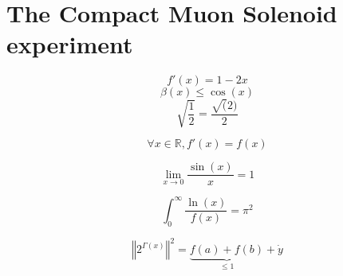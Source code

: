 \section{The Compact Muon Solenoid experiment}
\label{sec:CMS}



\[ f'(x) = 1-2x \]
\[ \beta(x) \leq \cos(x) \]
\[ \sqrt{\frac{1}{2}}=\frac{\sqrt(2)}{2} \]

\begin{equation}
\forall x \in \mathbb{R}, f'(x)=f(x)
\end{equation}

\begin{equation}
\lim_{x\to 0}\frac{\sin(x)}{x}=1
\end{equation}

\begin{equation}
\int_{0}^{\infty}\frac{\ln(x)}{f(x)}=\pi^2
\end{equation}

\begin{equation*}
\left\Vert 2^{\Gamma(x)} \right\Vert^{2} = \underbrace{f(a)+f(b)}_{\leq 1}+\dot{y}
\end{equation*}

